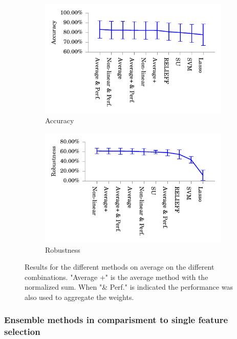 \documentclass[twoside,11pt]{article}
\begin{document}
\begin{figure}[!h]
\centering
\begin{subfigure}{.5\textwidth}
  \centering
  \includegraphics[width=1.07\textwidth]{images/Accuracy_of_the_different_methods.pdf}
  \caption{Accuracy}
  \label{fig:methods_accuracy}
\end{subfigure}%
\begin{subfigure}{.5\textwidth}
  \centering
  \includegraphics[width=1.07\textwidth]{images/Robustness_of_the_different_methods.pdf}
  \caption{Robustness}
  \label{fig:methods_robustness}
\end{subfigure}
\caption{Results for the different methods on average on the different combinations. "Average +" is the average method with the normalized sum. When "\& Perf." is indicated the performance was also used to aggregate the weights.}
\label{fig:methods_results}
\end{figure}

\subsubsection{Ensemble methods in comparisment to single feature selection}
\end{document}
